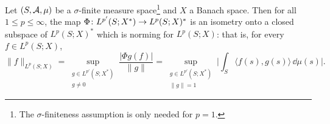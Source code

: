 \begin{prop}\label{prop:bochner-preduality}
  Let $(S,\mathcal{A},\mu)$ be a $\sigma$-finite measure space\footnote{The $\sigma$-finiteness assumption is only needed for $p = 1$.} and $X$ a Banach space.
  Then for all $1 \leq p \leq \infty$, the map $\Phi \colon L^{p'}(S;X^*) \rightarrow L^p(S;X)^*$ is an isometry onto a closed subspace of $L^p(S;X)^*$ which is norming for $L^p(S;X)$: that is, for every $f \in L^p(S;X)$,
  \begin{equation*}
    \|f\|_{L^p(S;X)} = \sup_{\substack{g \in L^{p'}(S;X^*) \\ g \neq 0}} \frac{| \Phi g(f) |}{\|g\|}
    = \sup_{\substack{g \in L^{p'}(S;X^*) \\ \|g\| = 1}} \Big| \int_S \langle f(s), g(s) \rangle \, \dd\mu(s) \Big|.
  \end{equation*}
\end{prop}

